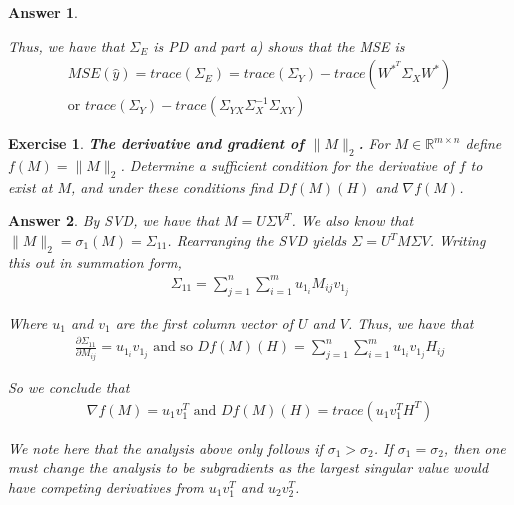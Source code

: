 \documentclass[12pt]{article}
\theoremstyle{colon}
\newtheorem{exercise}{Exercise}
\newtheorem*{answer}{Answer}
\begin{document}
\begin{answer}
\begin{enumerate}[label=\alph*)]
      Thus, we have that $\Sigma_E$ is PD and part a) shows that the MSE is
      \begin{gather*}
        MSE(\hat{y}) = trace(\Sigma_E) = trace(\Sigma_Y)- trace(W^{*^T} \Sigma_X W^*) \\
        \text{or } trace(\Sigma_Y)- trace(\Sigma_{YX} \Sigma_X^{-1} \Sigma_{XY})
      \end{gather*}

  \end{enumerate}
\end{answer}

\clearpage

\begin{exercise}
  \textbf{The derivative and gradient of $\lVert M \rVert_2$.} For $M \in \mathbb{R}^{m \times n}$ define $f(M) = \lVert M \rVert_2$. Determine a sufficient condition for the derivative of $f$ to exist at $M$, and under these conditions find $D f(M)(H)$ and $\nabla f(M)$.
\end{exercise}

\begin{answer}
  By SVD, we have that $M = U\Sigma V^T$. We also know that $\lVert M \rVert_2 = \sigma_1(M) = \Sigma_{11}$. Rearranging the SVD yields $\Sigma = U^T M \Sigma V$. Writing this out in summation form,
  \begin{gather*}
    \Sigma_{11} = \sum_{j=1}^n \sum_{i=1}^m u_{1_i} M_{ij} v_{1_j}
  \end{gather*}

  Where $u_1$ and $v_1$ are the first column vector of $U$ and $V$. Thus, we have that
  \begin{gather*}
    \frac{\partial \Sigma_{11}}{\partial M_{ij}} = u_{1_i} v_{1_j} \text{ and so } D f(M)(H) = \sum_{j=1}^n \sum_{i=1}^m u_{1_i} v_{1_j} H_{ij}
  \end{gather*}

  So we conclude that
  \begin{gather*}
    \nabla f(M) = u_1 v_1^T \text{ and } D f(M)(H) = trace(u_1 v_1^T H^T)
  \end{gather*}

  We note here that the analysis above only follows if $\sigma_1 > \sigma_2$. If $\sigma_1 = \sigma_2$, then one must change the analysis to be subgradients as the largest singular value would have competing derivatives from $u_1 v_1^T$ and $u_2 v_2^T$.

\end{answer}
\end{document}
